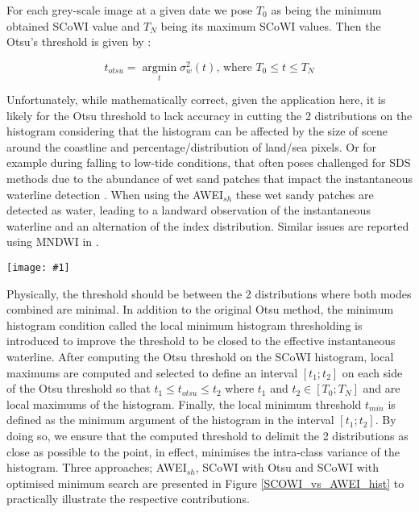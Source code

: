 \documentclass[remotesensing,article,submit,pdftex,moreauthors]{Definitions/mdpi}
\newcommand{\myfigure}[4]{
    \begin{figure*}[ht!]
        \centering
        \texttt{[image: \#1]}	 
        \caption{\itshape#2}
        \label{#3}
    \end{figure*} 
}
\begin{document}
For each grey-scale image at a given date we pose $T_0$ as being the minimum obtained SCoWI value and $T_N$ being its maximum SCoWI values. Then the Otsu's threshold is given by :

\begin{equation}
    t_{otsu} = \operatorname*{argmin}_t \sigma_w^2(t) \text{, where }T_0 \le t \le T_N
\end{equation}

Unfortunately, while mathematically correct, given the application here, it is likely for the Otsu threshold to lack accuracy in cutting the 2 distributions on the histogram considering that the histogram can be affected by the size of scene around the coastline and percentage/distribution of land/sea pixels. Or for example during falling to low-tide conditions, that often poses challenged for SDS methods due to the abundance of wet sand patches that impact the instantaneous waterline detection \citep{CASTELLE2021107707}. When using the AWEI$_{sh}$ these wet sandy patches are detected as water, leading to a landward observation of the instantaneous waterline and an alternation of the index distribution. Similar issues are reported using MNDWI in \citet{VOS2019_sub}. 

\myfigure{img/AWEIsh_vs_SCOWI_crop_new.png}{a) AWEI$_{sh}$ histogram of this Sentinel-2 acquisition. The dashed blue line is the Otsu threshold value computed for this histogram. b) SCoWI histogram of this Sentinel-2 acquisition in which the dashed green line indicates the Otsu threshold value while the dashed red line shows the position of the local histogram minimum. c) Sentinel-2 acquisition at Capbreton, French Atlantic coast during low tide. Instantaneous waterlines are extracted through the 3 methods: cyan is AWEI$_{sh}$, green represents the SCoWI with Otsu and red shows the SCoWI with local minimum approach. Waterline extracted by the SCoWI combined to the local minimum histogram thresholding method (red line) is the closest to the actual waterline on the acquisition. }{SCOWI_vs_AWEI_hist}{0.8}

Physically, the threshold should be between the 2 distributions where both modes combined are minimal. In addition to the original Otsu method, the minimum histogram condition called the local minimum histogram thresholding is introduced to improve the threshold to be closed to the effective instantaneous waterline. After computing the Otsu threshold on the SCoWI histogram, local maximums are computed and selected to define an interval $[t_1 ; t_2]$ on each side of the Otsu threshold so that $t_1 \le t_{otsu} \le t_2$ where $t_1$ and $t_2 \in [T_0;T_N]$ and are local maximums of the histogram. Finally, the local minimum threshold $t_{min}$ is defined as the minimum argument of the histogram in the interval $[t_1 ; t_2]$. By doing so, we ensure that the computed threshold to delimit the 2 distributions as close as possible to the point, in effect, minimises the intra-class variance of the histogram. Three approaches; AWEI$_{sh}$, SCoWI with Otsu and SCoWI with optimised minimum search are presented in Figure \ref{SCOWI_vs_AWEI_hist} to practically illustrate the respective contributions.
\end{document}
